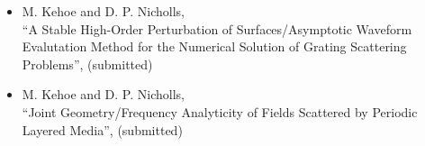 \begin{singlespace}
\begin{description}[labelwidth=4cm,leftmargin=4.2cm,itemsep=1em]
        \item[PUBLICATIONS]
            \begin{itemize}[label={},listparindent=0pt,itemindent=0pt,leftmargin=0pt,itemsep=1em,parsep=0pt,topsep=0pt,partopsep=0pt]

                \item M. Kehoe and D. P. Nicholls,\\
                ``A Stable High-Order Perturbation of Surfaces/Asymptotic Waveform Evalutation Method for the Numerical Solution of Grating Scattering Problems'', (submitted)

                \item M. Kehoe and D. P. Nicholls,\\
                ``Joint Geometry/Frequency Analyticity of Fields Scattered by Periodic Layered Media'', (submitted)

            \end{itemize}
    \end{description}
\end{singlespace}

